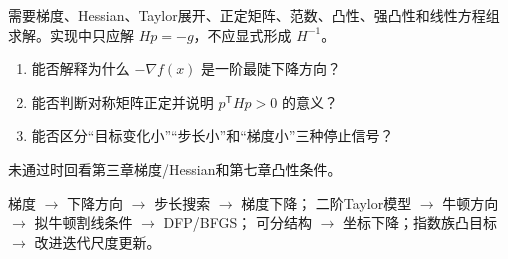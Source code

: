 \label{struct:V1-C08-CH01}

\label{struct:V1-C08-CH02}
\begin{prerequisitebox}
需要梯度、Hessian、Taylor展开、正定矩阵、范数、凸性、强凸性和线性方程组求解。实现中只应解 $Hp=-g$，不应显式形成 $H^{-1}$。
\end{prerequisitebox}

\label{struct:V1-C08-CH03}
\begin{precheckbox}
\begin{enumerate}[leftmargin=2.2em]
  \item 能否解释为什么 $-\nabla f(x)$ 是一阶最陡下降方向？
  \item 能否判断对称矩阵正定并说明 $p^{\mathsf T}Hp>0$ 的意义？
  \item 能否区分“目标变化小”“步长小”和“梯度小”三种停止信号？
\end{enumerate}
未通过时回看第三章梯度/Hessian和第七章凸性条件。
\end{precheckbox}

\label{struct:V1-C08-CH04}
\begin{dependencybox}
梯度 $\to$ 下降方向 $\to$ 步长搜索 $\to$ 梯度下降；
二阶Taylor模型 $\to$ 牛顿方向 $\to$ 拟牛顿割线条件 $\to$ DFP/BFGS；
可分结构 $\to$ 坐标下降；指数族凸目标 $\to$ 改进迭代尺度更新。
\end{dependencybox}

